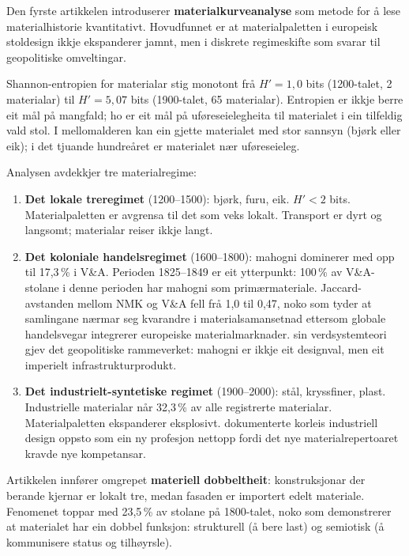 \documentclass[10pt, a4paper, twocolumn]{article}
\begin{document}
Den fyrste artikkelen introduserer \textbf{materialkurveanalyse} som metode for å lese materialhistorie kvantitativt. Hovudfunnet er at materialpaletten i europeisk stoldesign ikkje ekspanderer jamnt, men i diskrete regimeskifte som svarar til geopolitiske omveltingar.

Shannon-entropien for materialar stig monotont frå $H' = 1{,}0$ bits (1200-talet, 2 materialar) til $H' = 5{,}07$ bits (1900-talet, 65 materialar). Entropien er ikkje berre eit mål på mangfald; ho er eit mål på uføreseielegheita til materialet i ein tilfeldig vald stol. I mellomalderen kan ein gjette materialet med stor sannsyn (bjørk eller eik); i det tjuande hundreåret er materialet nær uføreseieleg.

Analysen avdekkjer tre materialregime:

\begin{enumerate}
  \item \textbf{Det lokale treregimet} (1200--1500): bjørk, furu, eik. $H' < 2$ bits. Materialpaletten er avgrensa til det som veks lokalt. Transport er dyrt og langsomt; materialar reiser ikkje langt.
  \item \textbf{Det koloniale handelsregimet} (1600--1800): mahogni dominerer med opp til 17,3\,\% i V\&A. Perioden 1825--1849 er eit ytterpunkt: 100\,\% av V\&A-stolane i denne perioden har mahogni som primærmateriale. Jaccard-avstanden mellom NMK og V\&A fell frå 1,0 til 0,47, noko som tyder at samlingane nærmar seg kvarandre i materialsamansetnad ettersom globale handelsvegar integrerer europeiske materialmarknader. \citet{wallerstein2004} sin verdsystemteori gjev det geopolitiske rammeverket: mahogni er ikkje eit designval, men eit imperielt infrastrukturprodukt.
  \item \textbf{Det industrielt-syntetiske regimet} (1900--2000): stål, kryssfiner, plast. Industrielle materialar når 32,3\,\% av alle registrerte materialar. Materialpaletten ekspanderer eksplosivt. \citet{heskett1980} dokumenterte korleis industriell design oppsto som ein ny profesjon nettopp fordi det nye materialrepertoaret kravde nye kompetansar.
\end{enumerate}

Artikkelen innfører omgrepet \textbf{materiell dobbeltheit}: konstruksjonar der berande kjernar er lokalt tre, medan fasaden er importert edelt materiale. Fenomenet toppar med 23,5\,\% av stolane på 1800-talet, noko som demonstrerer at materialet har ein dobbel funksjon: strukturell (å bere last) og semiotisk (å kommunisere status og tilhøyrsle).
\end{document}
